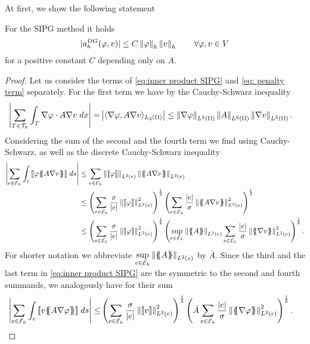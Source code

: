 At first, we show the following statement
\begin{lemma}\label{la: SIPG continuous}
	For the SIPG method it holds
	\[
	|a_h^{DG}(\varphi, v) | \leq C \left\lVert \varphi \right\rVert_{h} \left\lVert v \right\rVert_{h} \qquad \forall \varphi,v \in V
	\]
	for a positive constant $C$ depending only on $A$.
\end{lemma}
\begin{proof}
	Let us consider the terms of \eqref{eq:inner product SIPG} and \eqref{eq: penalty term} separately.
	For the first term we have by the Cauchy-Schwarz inequality
	\begin{align}
	\left| \sum\limits_{T \in \mathcal{T}_h} \int_{T} {{ \nabla \varphi \cdot A \nabla v}\;dx} \right|
	 =& \left|   \langle \nabla \varphi, A\nabla v \rangle _{L_2(\Omega)}  \right|
	  \leq \left\lVert \nabla \varphi \right\rVert_{L^2(\Omega)} \left\lVert A \right\rVert_{L^2(\Omega)} \left\lVert \nabla v \right\rVert_{L^2(\Omega)}. \label{eq: CS estimate 0}
	\end{align}
	Considering the sum of the second and the fourth term we find using Cauchy-Schwarz, as well as the discrete Cauchy-Schwarz inequality
	\begin{align}
	\singleNorm{\sum\limits_{e \in \edges}\myIntS e { \jump {\varphi \average{A \nabla v} }}} &\leq
	\sum\limits_{e \in \edges}  \LTwonormE{\jump {\varphi}} \LTwonormE {\average{A \nabla v}} \nonumber \\
	& \leq
	\left( \sum\limits_{e \in \edges} \frac {\sigma}{|e|} \LTwonormE{\jump {\varphi}}^2 \right)^{\frac 1 2}
	\left( \sum\limits_{e \in \edges} \frac {|e|} \sigma \LTwonormE{\average{A \nabla v}}^2 \right)^{\frac 1 2} 	 \nonumber \\
	& \leq
	\left( \sum\limits_{e \in \edges} \frac {\sigma}{|e|} \LTwonormE{\jump {\varphi}}^2 \right)^{\frac 1 2}
	 \left( \sup\limits_{e \in \edges} \LTwonormE{\average{A}}\sum\limits_{e \in \edges} \frac {|e|} \sigma \LTwonormE{\average{\nabla v}}^2 \right)^{\frac 1 2}. \label{eq: CS estimate}
	\end{align}
	For shorter notation we abbreviate $\sup\limits_{e \in \mathcal{E}_h} \left\lVert \{\!\!\{ A \}\!\!\} \right\rVert_{L^2(e)}$ by $\bar A$. Since the third and the last term in \eqref{eq:inner product SIPG} are the symmetric to the second and fourth summands, we analogously have for their sum
	\begin{align}
	\singleNorm{\sum\limits_{e \in \edges}\myIntS e { \jump {v \average{A \nabla \varphi} }}} \leq&
	\left( \sum\limits_{e \in \edges} \frac {\sigma}{|e|}\LTwonormE{\jump {v}}^2 \right)^{\frac 1 2}
	\left( \bar A \sum\limits_{e \in \edges} \frac {|e|} \sigma \LTwonormE{\average{\nabla \varphi}}^2 \right)^{\frac 1 2}.\label{eq: CS estimate2}

\end{align}
\end{proof}
